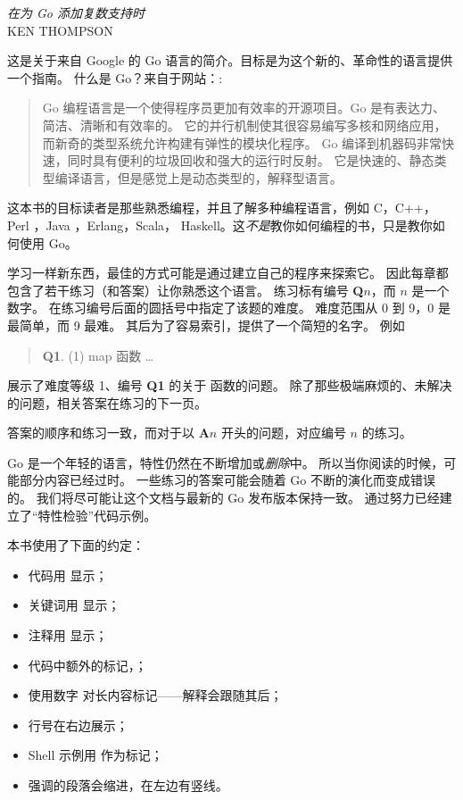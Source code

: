 {\textit{在为 Go 添加复数支持时}\\ \textsc{KEN THOMPSON}}

\noindent{}这是关于来自 Google 的 Go 语言的简介。目标是为这个新的、革命性的语言提供一个指南。
什么是 Go？来自于网站：\cite{go_web}:
\begin{quote}
Go 编程语言是一个使得程序员更加有效率的开源项目。Go 是有表达力、简洁、清晰和有效率的。
它的并行机制使其很容易编写多核和网络应用，而新奇的类型系统允许构建有弹性的模块化程序。
Go 编译到机器码非常快速，同时具有便利的垃圾回收和强大的运行时反射。
它是快速的、静态类型编译语言，但是感觉上是动态类型的，解释型语言。
\end{quote}

这本书的目标读者是那些熟悉编程，并且了解多种编程语言，例如 C\cite{c}，C++\cite{c++}，
Perl \cite{perl}，Java \cite{java}，Erlang\cite{erlang}，Scala\cite{scala}，
Haskell\cite{haskell}。这\emph{不是}教你如何编程的书，只是教你如何使用 Go。

学习一样新东西，最佳的方式可能是通过建立自己的程序来探索它。
因此每章都包含了若干练习（和答案）让你熟悉这个语言。
练习标有编号 \textbf{Q$n$}，而 $n$ 是一个数字。 在练习编号后面的圆括号中指定了该题的难度。
难度范围从 0 到 9，0 是最简单，而 9 最难。
其后为了容易索引，提供了一个简短的名字。
例如
\begin{verse}
\textbf{Q1}. (1) map 函数 \ldots
\end{verse}

展示了难度等级 1、编号 \textbf{Q1} 的关于  函数的问题。
除了那些极端麻烦的、未解决的问题，相关答案在练习的下一页。

答案的顺序和练习一致，而对于以 \textbf{A$n$} 开头的问题，对应编号 $n$ 的练习。

Go 是一个年轻的语言，特性仍然在不断增加或\emph{删除}中。
所以当你阅读的时候，可能部分内容已经过时。
一些练习的答案可能会随着 Go 不断的演化而变成错误的。
我们将尽可能让这个文档与最新的 Go 发布版本保持一致。
通过努力已经建立了“特性检验”代码示例。

本书使用了下面的约定：
\begin{itemize}
\item 代码用  显示；
\item 关键词用  显示；
\item 注释用  显示；
\item 代码中额外的标记，；
\item 使用数字  对长内容标记——解释会跟随其后；
\item 行号在右边展示；
\item Shell 示例用 \pr{} 作为标记；
\item 强调的段落会缩进，在左边有竖线。
\end{itemize}

